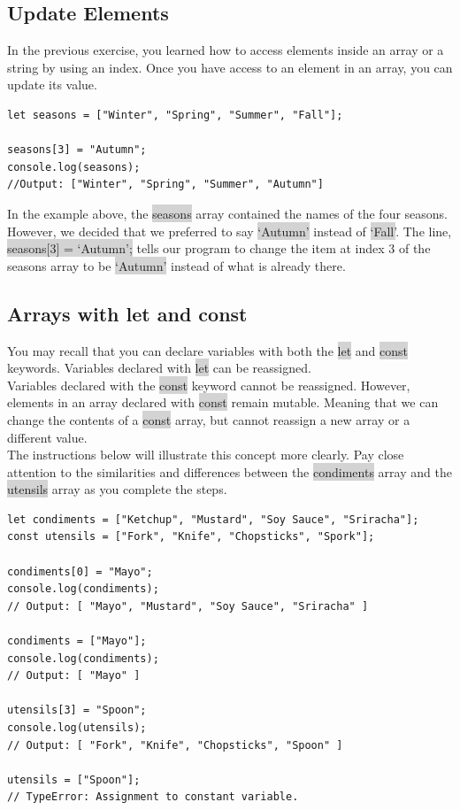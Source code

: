 \documentclass[11pt]{article}
\begin{document}
\subsection{Update Elements} 
In the previous exercise, you learned how to access elements inside an array or a string by using an index. Once you have access to an element in an array, you can update its value. 
\begin{lstlisting}
let seasons = ["Winter", "Spring", "Summer", "Fall"];

seasons[3] = "Autumn";
console.log(seasons); 
//Output: ["Winter", "Spring", "Summer", "Autumn"]
\end{lstlisting}
In the example above, the \colorbox{lightgray}{seasons} array contained the names of the four seasons. However, we decided that we preferred to say \colorbox{lightgray}{`Autumn'} instead of \colorbox{lightgray}{`Fall'}. The line, \colorbox{lightgray}{seasons[3] = `Autumn';} tells our program to change the item at index 3 of the seasons array to be \colorbox{lightgray}{`Autumn'} instead of what is already there.

\subsection{Arrays with let and const}
You may recall that you can declare variables with both the \colorbox{lightgray}{let} and \colorbox{lightgray}{const} keywords. Variables declared with \colorbox{lightgray}{let} can be reassigned. \\
\newline
Variables declared with the \colorbox{lightgray}{const} keyword cannot be reassigned. However, elements in an array declared with \colorbox{lightgray}{const} remain mutable. Meaning that we can change the contents of a \colorbox{lightgray}{const} array, but cannot reassign a new array or a different value. \\
\newline
The instructions below will illustrate this concept more clearly. Pay close attention to the similarities and differences between the \colorbox{lightgray}{condiments} array and the \colorbox{lightgray}{utensils} array as you complete the steps.
\begin{lstlisting}
let condiments = ["Ketchup", "Mustard", "Soy Sauce", "Sriracha"];
const utensils = ["Fork", "Knife", "Chopsticks", "Spork"];

condiments[0] = "Mayo";
console.log(condiments); 
// Output: [ "Mayo", "Mustard", "Soy Sauce", "Sriracha" ]

condiments = ["Mayo"]; 
console.log(condiments); 
// Output: [ "Mayo" ]

utensils[3] = "Spoon";
console.log(utensils); 
// Output: [ "Fork", "Knife", "Chopsticks", "Spoon" ]

utensils = ["Spoon"]; 
// TypeError: Assignment to constant variable.
\end{lstlisting}
\end{document}
